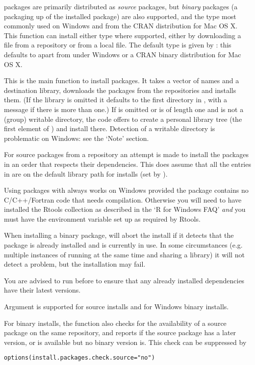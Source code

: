 \begin{Details}\relax
\R{} packages are primarily distributed as \emph{source} packages, but
\emph{binary} packages (a packaging up of the installed package) are
also supported, and the type most commonly used on Windows and from
the CRAN distribution for Mac OS X.  This function can install either
type where supported, either by downloading a file from a repository
or from a local file.  The default type is given by
: this defaults to 
apart from under Windows or a CRAN binary distribution for Mac OS X.

This is the main function to install packages.  It takes
a vector of names and a destination library, downloads the packages
from the repositories and installs them.  (If the library is omitted
it defaults to the first directory in , with a
message if there is more than one.)  If  is omitted or is of
length one and is not a (group) writable directory, the code offers
to create a personal library tree (the first element of
) and install there.
Detection of a writable directory is problematic on Windows: see the
`Note' section.

For source packages from a repository an attempt is made to
install the packages in an order that respects their dependencies.
This does assume that all the entries in  are on the default
library path for installs (set by ).

Using packages with  always works on Windows
provided the package contains no C/C++/Fortran code that needs
compilation.  Otherwise you will need to have installed the Rtools
collection as described in the `R for Windows FAQ' \emph{and}
you must have the  environment variable set up as required
by Rtools.

When installing a binary package,  will abort
the install if it detects that the package is already installed and is
currently in use.  In some circumstances (e.g. multiple instances of
\R{} running at the same time and sharing a library) it will not detect a
problem, but the installation may fail.

You are advised to run  before
 to ensure that any already installed
dependencies have their latest versions.

Argument  is supported for source installs and for
Windows binary installs.

For binary installs, the function also checks for the availability of
a source package on the same repository, and reports if the source
package has a later version, or is available but no binary version
is.  This check can be suppressed by
\begin{alltt}
      options(install.packages.check.source = "no")
\end{alltt}

\end{Details}
